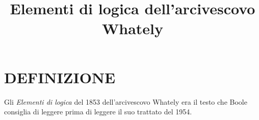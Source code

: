 \documentclass[a4paper,10pt]{article}
\title{Elementi di logica dell'arcivescovo Whately}
\begin{document}
\maketitle

\section{DEFINIZIONE}
Gli \textit{Elementi di logica} del 1853 dell'arcivescovo Whately era il testo che Boole consiglia di leggere prima di leggere il suo trattato del 1954.
\end{document}
